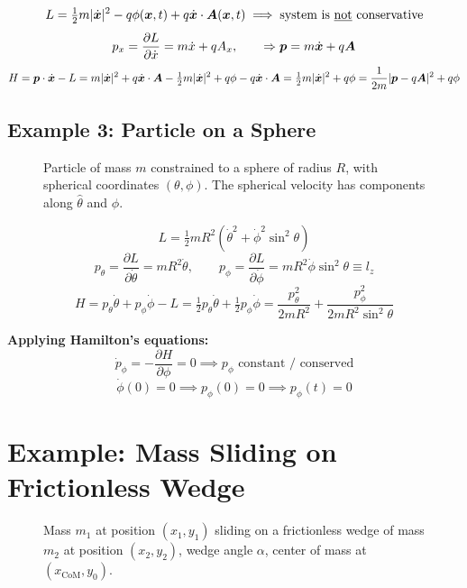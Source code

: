 \[
    L = \tfrac{1}{2}m|\dot{\lvect{x}}|^2 - q\phi(\lvect{x},t) + q\dot{\lvect{x}}\cdot\vect{A}(\lvect{x},t) \implies \text{system is \underline{not} conservative}
\]
\[
    p_x = \frac{\partial L}{\partial \dot{x}} = m\dot{x} + qA_x, \qquad \Rightarrow \lvect{p} = m\dot{\lvect{x}} + q\vect{A}
\]
\[
    H = \lvect{p}\cdot\dot{\lvect{x}} - L = m|\dot{\lvect{x}}|^2 + q\dot{\lvect{x}}\cdot\vect{A} - \tfrac{1}{2}m|\dot{\lvect{x}}|^2 + q\phi - q\dot{\lvect{x}}\cdot\vect{A}
    = \tfrac{1}{2}m|\dot{\lvect{x}}|^2 + q\phi
    = \frac{1}{2m}|\lvect{p} - q\vect{A}|^2 + q\phi
\]

\subsection*{Example 3: Particle on a Sphere}

\begin{figure}[H]
    \centering
    \caption{Particle of mass $m$ constrained to a sphere of radius $R$, with spherical coordinates $(\theta,\phi)$. The spherical velocity has components along $\hat{\theta}$ and $\hat{\phi}$.}
\end{figure}

\[
    L = \tfrac{1}{2}mR^2\!\left(\dot{\theta}^2 + \dot{\phi}^2\sin^2\!\theta\right)
\]
\[
    p_\theta = \frac{\partial L}{\partial \dot{\theta}} = mR^2\dot{\theta}, \qquad p_\phi = \frac{\partial L}{\partial \dot{\phi}} = mR^2\dot{\phi}\sin^2\!\theta \equiv l_z
\]
\[
    H = p_\theta\dot{\theta} + p_\phi\dot{\phi} - L = \tfrac{1}{2}p_\theta\dot{\theta} + \tfrac{1}{2}p_\phi\dot{\phi} = \frac{p_\theta^2}{2mR^2} + \frac{p_\phi^2}{2mR^2\sin^2\!\theta}
\]

\textbf{Applying Hamilton's equations:}
\[
    \dot{p}_\phi = -\frac{\partial H}{\partial \phi} = 0 \implies p_\phi \text{ constant / conserved}
\]
\[
    \dot{\phi}(0) = 0 \implies p_\phi(0) = 0 \implies p_\phi(t) = 0
\]


\section*{Example: Mass Sliding on Frictionless Wedge}

\begin{figure}[H]
    \centering
    \caption{Mass $m_1$ at position $(x_1,y_1)$ sliding on a frictionless wedge of mass $m_2$ at position $(x_2, y_2)$, wedge angle $\alpha$, center of mass at $(x_\text{CoM}, y_0)$.}
\end{figure}


